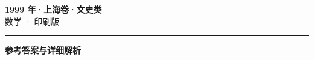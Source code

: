 \documentclass[zihao=5, a4paper]{ctexart}
\begin{document}
\begin{center}
  {\Large\bfseries 1999 年·上海卷·文史类}\\[4pt]
  {\large 数学 · 印刷版}
\end{center}
\medskip
{}

\par\bigskip\hrule\bigskip
{}
\begin{center}{\large\bfseries 参考答案与详细解析}\end{center}
\smallskip

\end{document}

